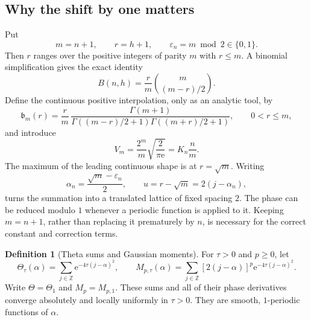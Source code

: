 \documentclass[11pt,a4paper]{article}
\numberwithin{equation}{section}
\theoremstyle{definition}
\newtheorem{definition}[theorem]{Definition}
\newcommand{\Z}{\mathbb Z}
\newcommand{\bcont}{\mathfrak b}
\newcommand{\eps}{\varepsilon}
\newcommand{\ee}{\mathrm e}
\begin{document}
\subsection{Why the shift by one matters}
Put
\begin{equation}\label{tbs:eq:shift}
 m=n+1,\qquad r=h+1,\qquad \eps_n=m\bmod2\in\{0,1\}.
\end{equation}
Then $r$ ranges over the positive integers of parity $m$ with $r\le m$.
A binomial simplification gives the exact identity
\begin{equation}\label{tbs:eq:shifted-ballot}
 B(n,h)=\frac r m\binom{m}{(m-r)/2}.
\end{equation}
Define the continuous positive interpolation, only as an analytic tool,
by
\begin{equation}\label{tbs:eq:gamma-interpolation}
 \bcont_m(r)=\frac r m\,
 \frac{\Gamma(m+1)}
 {\Gamma((m-r)/2+1)\Gamma((m+r)/2+1)},\qquad 0<r\le m,
\end{equation}
and introduce
\begin{equation}\label{tbs:eq:V}
 V_m=\frac{2^m}{m}\sqrt{\frac2{\pi\ee}}
 =K_n\frac n m.
\end{equation}
The maximum of the leading continuous shape is at $r=\sqrt m$.
Writing
\begin{equation}\label{tbs:eq:phase-u}
 \alpha_n=\frac{\sqrt m-\eps_n}{2},\qquad
 u=r-\sqrt m=2(j-\alpha_n),
\end{equation}
turns the summation into a translated lattice of fixed spacing $2$.
The phase can be reduced modulo $1$ whenever a periodic function is
applied to it. Keeping $m=n+1$, rather than replacing it prematurely by
$n$, is necessary for the correct constant and correction terms.

\begin{definition}[Theta sums and Gaussian moments]
For $\tau>0$ and $p\ge0$, let
\begin{equation}\label{tbs:eq:theta}
 \Theta_\tau(\alpha)=\sum_{j\in\Z}\ee^{-4\tau(j-\alpha)^2},\qquad
 M_{p,\tau}(\alpha)=\sum_{j\in\Z}[2(j-\alpha)]^p
                         \ee^{-4\tau(j-\alpha)^2}.
\end{equation}
Write $\Theta=\Theta_1$ and $M_p=M_{p,1}$. These sums and all of their
phase derivatives converge absolutely and locally uniformly in $\tau>0$.
They are smooth, $1$-periodic functions of $\alpha$.
\end{definition}
\end{document}
